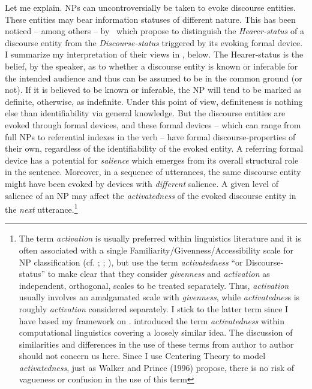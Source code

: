 \documentclass[output=paper
,modfonts
,nonflat]{langsci/langscibook}
\begin{document}
Let me explain. NPs can uncontroversially be taken to evoke discourse entities. These entities may bear information statuses of different nature. This has been noticed -- among others -- by~\citet[291--294]{WalkerPrince1996} which propose to distinguish the \textit{Hearer-status} of a discourse entity from the \textit{Discourse-status} triggered by its evoking formal device. I summarize my interpretation of their views in , below. The Hearer-status is the belief, by the speaker, as to whether a discourse entity is known or inferable for the intended audience and thus can be assumed to be in the common ground (or not). If it is believed to be known or inferable, the NP will tend to be marked as definite, otherwise, as indefinite. Under this point of view, definiteness is nothing else than identifiability via general knowledge. But the discourse entities are evoked through formal devices, and these formal devices -- which can range from full NPs to referential indexes in the verb -- have formal discourse-properties of their own, regardless of the identifiability of the evoked entity. A referring formal device has a potential for \textit{salience} which emerges from its overall structural role in the sentence. Moreover, in a sequence of utterances, the same discourse entity might have been evoked by devices with \textit{different} salience. A given level of salience of an NP may affect the \textit{activatedness} of the evoked discourse entity in the \textit{next} utterance.\footnote{The term \textit{activation} is usually preferred within linguistics literature and it is often associated with a single Familiarity/Givenness/Accessibility scale for NP classification (cf. \citealt{Ariel1990}; \citealt{GundelEtAlii1993}; \citealt{Kibrik2011}), but \citet[294]{WalkerPrince1996} use the term \textit{activatedness} “or Discourse-status” to make clear that they consider \textit{givenness} and \textit{activation} as independent, orthogonal, scales to be treated separately. Thus, \textit{activation} usually involves an amalgamated scale with \textit{givenness}, while \textit{activatednes}s is roughly \textit{activation} considered separately. I stick to the latter term since I have based my framework on \citet{WalkerPrince1996}. \citet{Kantor1977} introduced the term \textit{activatedness} within computational linguistics covering a loosely similar idea. The discussion of similarities and differences in the use of these terms from author to author should not concern us here. Since I use Centering Theory to model \textit{activatedness}, just as Walker and Prince (1996) propose, there is no risk of vagueness or confusion in the use of this term}
\end{document}
